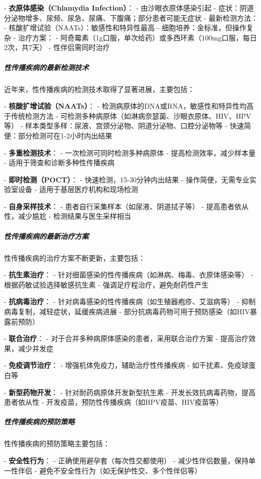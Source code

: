 \begin{enumerate}
- \textbf{衣原体感染（Chlamydia Infection）}：
  - 由沙眼衣原体感染引起
  - 症状：阴道分泌物增多、尿频、尿急、尿痛、下腹痛；部分患者可能无症状
  - 最新检测方法：
    - 核酸扩增试验（NAATs）：敏感性和特异性最高
    - 细胞培养：金标准，但操作复杂
  - 治疗方案：
    - 阿奇霉素（1g口服，单次给药）或多西环素（100mg口服，每日2次，共7天）
    - 性伴侣需同时治疗

\subparagraph{性传播疾病的最新检测技术}

近年来，性传播疾病的检测技术取得了显著进展，主要包括：

- \textbf{核酸扩增试验（NAATs）}：
  - 检测病原体的DNA或RNA，敏感性和特异性均高于传统检测方法
  - 可检测多种病原体（如淋病奈瑟菌、沙眼衣原体、HIV、HPV等）
  - 样本类型多样：尿液、宫颈分泌物、阴道分泌物、口腔分泌物等
  - 快速简便：部分检测可在1-2小时内出结果

- \textbf{多重检测技术}：
  - 一次检测可同时检测多种病原体
  - 提高检测效率，减少样本量
  - 适用于筛查和诊断多种性传播疾病

- \textbf{即时检测（POCT）}：
  - 快速检测，15-30分钟内出结果
  - 操作简便，无需专业实验室设备
  - 适用于基层医疗机构和现场检测

- \textbf{自身采样技术}：
  - 患者自行采集样本（如尿液、阴道拭子等）
  - 提高患者依从性，减少尴尬
  - 检测结果与医生采样相当

\subparagraph{性传播疾病的最新治疗方案}

性传播疾病的治疗方案不断更新，主要包括：

- \textbf{抗生素治疗}：
  - 针对细菌感染的性传播疾病（如淋病、梅毒、衣原体感染等）
  - 根据药敏试验选择敏感抗生素
  - 强调足疗程治疗，避免耐药性产生

- \textbf{抗病毒治疗}：
  - 针对病毒感染的性传播疾病（如生殖器疱疹、艾滋病等）
  - 抑制病毒复制，减轻症状，延缓疾病进展
  - 部分抗病毒药物可用于预防感染（如HIV暴露前预防）

- \textbf{联合治疗}：
  - 对于合并多种病原体感染的患者，采用联合治疗方案
  - 提高治疗效果，减少并发症

- \textbf{免疫调节治疗}：
  - 增强机体免疫力，辅助治疗性传播疾病
  - 如干扰素、免疫球蛋白等

- \textbf{新型药物开发}：
  - 针对耐药病原体开发新型抗生素
  - 开发长效抗病毒药物，提高患者依从性
  - 开发疫苗，预防性传播疾病（如HPV疫苗、HIV疫苗等）

\subparagraph{性传播疾病的预防策略}

性传播疾病的预防策略主要包括：

- \textbf{安全性行为}：
  - 正确使用避孕套（每次性交都使用）
  - 减少性伴侣数量，保持单一性伴侣
  - 避免不安全性行为（如无保护性交、多个性伴侣等）


\end{enumerate}

